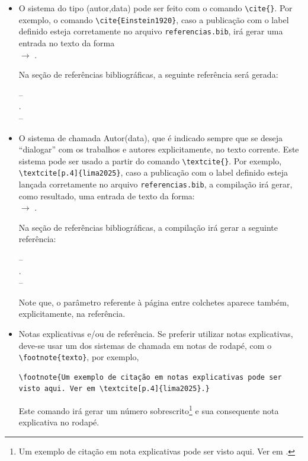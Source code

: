 \documentclass[
	12pt,				%
	openright,			%
	oneside,			%
	a4paper,			%
	english,			%
	brazil				%
	]{abntex2}
\begin{document}
	\begin{itemize}
		\item[a)] O sistema do tipo (autor,data) pode ser feito com o comando \verb|\cite{}|. Por exemplo, o comando \verb|\cite{Einstein1920}|, caso a publicação com o label definido esteja corretamente no arquivo \verb|referencias.bib|, irá gerar uma entrada no texto da forma \\ $\to$ \cite{Einstein1920}.
		
		Na seção de referências bibliográficas, a seguinte referência será gerada:
		
		--\\
		\noindent{}.
		\\--
		
		\item[b)] O sistema de chamada Autor(data), que é indicado sempre que se deseja ``dialogar'' com os trabalhos e autores explicitamente, no texto corrente. Este sistema pode ser usado a partir do comando \verb|\textcite{}|. Por exemplo, \verb|\textcite[p.4]{lima2025}|, caso a publicação com o label definido esteja lançada corretamente no arquivo \verb|referencias.bib|, a compilação irá gerar, como resultado, uma entrada de texto da forma: \\  $\to$ \textcite[p.4]{lima2025}.
		
		Na seção de referências bibliográficas, a compilação irá gerar a seguinte referência:
		
		--\\
		\noindent{}.
		\\--
		
		Note que, o parâmetro referente à página entre colchetes aparece também, explicitamente, na referência.
		
		\item[c)] Notas explicativas e/ou de referência. Se preferir utilizar notas explicativas, deve-se usar um dos sistemas de chamada em  notas de rodapé, com o \verb*|\footnote{texto}|, por exemplo, 


\begin{lstlisting}[label=cod:001]
	\footnote{Um exemplo de citação em notas explicativas pode ser visto aqui. Ver em \textcite[p.4]{lima2025}.}
\end{lstlisting}
			
\noindent Este comando irá gerar um número sobrescrito\footnote{Um exemplo de citação em nota explicativas pode ser visto aqui. Ver em \textcite[p.4]{lima2025}.} e sua consequente nota explicativa no rodapé.
		
\end{itemize}
\end{document}

